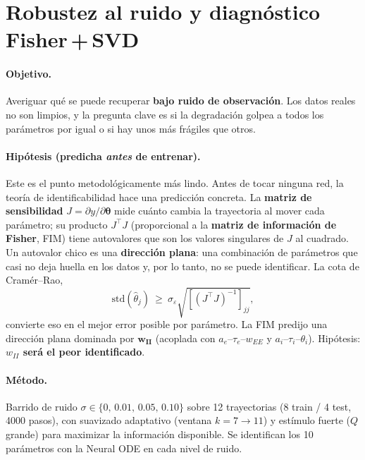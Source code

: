 \documentclass[11pt,a4paper]{article}
\newcommand{\thetavec}{\bm{\theta}}
\newcommand{\transp}{^{\top}}
\begin{document}
\section{Robustez al ruido y diagnóstico Fisher\,+\,SVD}
\label{sec:ruido}

\paragraph{Objetivo.} Averiguar qué se puede recuperar \textbf{bajo ruido de observación}. Los datos reales no son limpios, y la pregunta clave es si la degradación golpea a todos los parámetros por igual o si hay unos más frágiles que otros.

\paragraph{Hipótesis (predicha \emph{antes} de entrenar).} Este es el punto metodológicamente más lindo. Antes de tocar ninguna red, la teoría de identificabilidad hace una predicción concreta. La \textbf{matriz de sensibilidad} $J=\partial y/\partial\thetavec$ mide cuánto cambia la trayectoria al mover cada parámetro; su producto $J\transp J$ (proporcional a la \textbf{matriz de información de Fisher}, FIM) tiene autovalores que son los valores singulares de $J$ al cuadrado. Un autovalor chico es una \textbf{dirección plana}: una combinación de parámetros que casi no deja huella en los datos y, por lo tanto, no se puede identificar. La cota de Cramér--Rao,
\begin{equation}
\mathrm{std}(\hat\theta_j)\ \ge\ \sigma_\varepsilon\sqrt{[(J\transp J)^{-1}]_{jj}},
\end{equation}
convierte eso en el mejor error posible por parámetro. La FIM predijo una dirección plana dominada por $\bm{w_{II}}$ (acoplada con $a_e$--$\tau_e$--$w_{EE}$ y $a_i$--$\tau_i$--$\theta_i$). Hipótesis: \textbf{$w_{II}$ será el peor identificado}.

\paragraph{Método.} Barrido de ruido $\sigma\in\{0,\,0.01,\,0.05,\,0.10\}$ sobre 12 trayectorias (8 train / 4 test, 4000 pasos), con suavizado adaptativo (ventana $k=7\to11$) y estímulo fuerte ($Q$ grande) para maximizar la información disponible. Se identifican los 10 parámetros con la Neural ODE en cada nivel de ruido.
\end{document}
